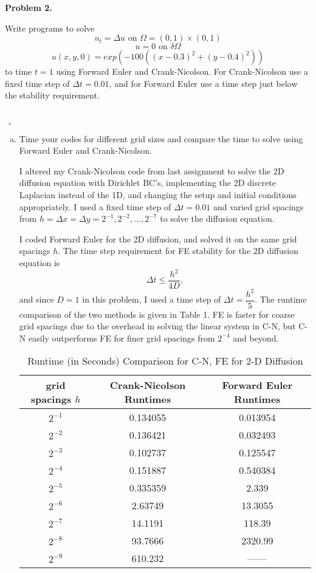 \documentclass[12pt]{article}
\newenvironment{myprob}[1]
    {%
    \noindent{\Huge$\ulcorner$}\textbf{#1.}\begin{em}
    }
    { 
    \end{em} \\ \hphantom{l} \hfill {\Huge$\lrcorner$} }
\begin{document}
\begin{myprob}{Problem 2}
Write programs to solve
$$u_t = \Delta u \text{ on } \Omega = (0,1) \times (0,1)$$
$$u=0 \text{ on } \delta \Omega$$
$$u(x,y,0) = exp(-100((x-0.3)^2+(y-0.4)^2))$$
to time $t=1$ using Forward Euler and Crank-Nicolson.  For Crank-Nicolson use a fixed time step of $\Delta t = 0.01$, and for Forward Euler use a time step just below the stability requirement.
\end{myprob}
\begin{enumerate}[(a)]
\item Time your codes for different grid sizes and compare the time to solve using Forward Euler and Crank-Nicolson.

I altered my Crank-Nicolson code from last assignment to solve the 2D diffusion equation with Dirichlet BC's, implementing the 2D discrete Laplacian instead of the 1D, and changing the setup and initial conditions appropriately.  I used a fixed time step of $\Delta t = 0.01$ and varied grid spacings from $h = \Delta x = \Delta y = 2^{-1}, 2^{-2}, \dots, 2^{-7}$ to solve the diffusion equation.

I coded Forward Euler for the 2D diffusion, and solved it on the same grid spacings $h$.  The time step requirement for FE stability for the 2D diffusion equation is $$\Delta t \leq \dfrac{h^2}{4 D},$$
and since $D=1$ in this problem, I used a time step of $\Delta t = \dfrac{h^2}{5}.$
The runtime comparison of the two methods is given in Table 1.  FE is faster for coarse grid spacings due to the overhead in solving the linear system in C-N, but C-N easily outperforms FE for finer grid spacings from $2^{-4}$ and beyond.

\begin{table}[H]
\caption{Runtime (in Seconds) Comparison for C-N, FE for 2-D Diffusion}
\centering\begin{tabular}{||c|c|c||}
\hline \hline
   grid spacings $h$ &   Crank-Nicolson Runtimes &    Forward Euler Runtimes  \\
\hline 
      $2^{-1}$ &   0.134055 &      0.013954    \\
      $2^{-2}$ &   0.136421 &    0.032493 \\
      $2^{-3}$ &  0.102737 &   0.125547  \\
      $2^{-4}$ &   0.151887 &    0.540384 \\
      $2^{-5}$ &    0.335359 &         2.339   \\
      $2^{-6}$ &    2.63749  &    13.3055    \\
      $2^{-7}$ &    14.1191  &   118.39    \\
      $2^{-8}$ &     93.7666  &   2320.99    \\
      $2^{-9}$ &     610.232  &    ------    \\
\hline\hline
\end{tabular}
\end{table}


\end{enumerate}
\end{document}
